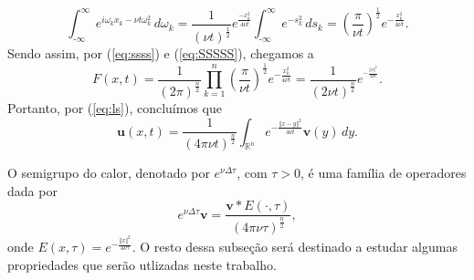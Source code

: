 \documentclass[a4paper, 11pt]{book}
\theoremstyle{definition}
\newcommand{\m}{\text{-}}
\newcommand{\bR}{\mathbb{R}}
\newcommand{\bu}{\mathbf{u}}
\newcommand{\bv}{\mathbf{v}}
\begin{document}
\begin{equation} \label{eq:SSSSS}
    \int_{\m\infty}^{\infty} e^{i \omega_k x_k - \nu t\omega_k^2} \,d\omega_k = \frac{1}{(\nu t)^{\frac{1}{2}}} e^{\frac{-x_k^2}{4\nu t}} \int_{\m\infty}^\infty e^{-s_k^2} \,ds_k = \left( \frac{\pi}{\nu t} \right)^{\frac{1}{2}} e^{-\frac{x_k^2}{4\nu t}}.
\end{equation}
Sendo assim, por (\ref{eq:ssss}) e (\ref{eq:SSSSS}), chegamos a
\[
    F(x,t)  =  \frac{1}{(2\pi)^\frac{n}{2}}\prod_{k=1}^n \left( \frac{\pi}{\nu t} \right)^{\frac{1}{2}} e^{-\frac{x_k^2}{4\nu t}} = \frac{1}{(2\nu t)^\frac{n}{2}} e^{^{-\frac{\Vert x \Vert^2}{4\nu t}}}.
\]
Portanto, por (\ref{eq:ls}), concluímos que
\[
    \bu (x,t) = \frac{1}{(4\pi\nu t)^{\frac{n}{2}}} \int_{\bR^n} e^{-\frac{\Vert x - y \Vert^2}{4 \nu t}} \bv(y) \,dy.
\]

O semigrupo do calor, denotado por $e^{\nu \Delta \tau}$, com $\tau > 0$, é uma família de operadores dada por
\[
    e^{\nu \Delta \tau} \bv = \frac{\bv * E(\cdot,\tau)}{(4\pi \nu \tau)^{\frac{n}{2}}},
\]
onde $E(x,\tau) = e^{-\frac{\Vert x \Vert^2}{4 \nu \tau}}$.
O resto dessa subseção será destinado a estudar algumas propriedades que serão utlizadas neste trabalho.
\end{document}
